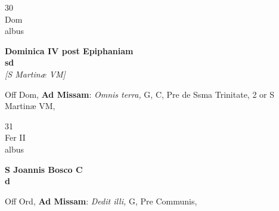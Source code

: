 \documentclass[10pt, openany]{book}
\begin{document}
        \begin{center}
            \begin{minipage}{3.5in}
                \vspace{2em}
                \begin{minipage}{0.5in}
                    {\Huge 30} \\
                    {\normalsize Dom} \\
                    {\normalsize albus}
                \end{minipage}
                \begin{minipage}{3.0in}
                    \textbf{ \large Dominica IV post Epiphaniam \\
                    \textnormal{\normalsize sd}} \\ \textit{[S Martinæ VM]} \\ 
                \end{minipage}
                \begin{justify}Off Dom, \textbf{Ad Missam}: \textit{Omnis terra,} G, C, Pre de Ssma Trinitate, 2 or S Martinæ VM,   
                \end{justify}
            \end{minipage}
        \end{center}
    
        \begin{center}
            \begin{minipage}{3.5in}
                \vspace{2em}
                \begin{minipage}{0.5in}
                    {\Huge 31} \\
                    {\normalsize Fer II} \\
                    {\normalsize albus}
                \end{minipage}
                \begin{minipage}{3.0in}
                    \textbf{ \large S Joannis Bosco C \\
                    \textnormal{\normalsize d}} \\ 
                \end{minipage}
                \begin{justify}Off Ord, \textbf{Ad Missam}: \textit{Dedit illi,} G, Pre Communis,   
                \end{justify}
            \end{minipage}
        \end{center}
    
\end{document}
